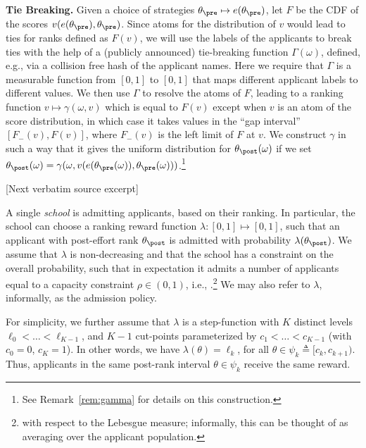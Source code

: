 \documentclass[10pt]{article}
\begin{document}
\begin{ReviewVerbatim}
{\textbf{Tie Breaking.}
Given a choice of strategies $\theta_\pre \mapsto e(\theta_\pre)$, let $F$ be the CDF of the scores $v(e(\theta_\pre),\theta_\pre)$.
Since atoms for the distribution of $v$ would lead to ties for ranks defined as $F(v)$, we will use the labels of the applicants to break ties with the help of a (publicly announced) tie-breaking function $\Gamma(\omega)$, defined, e.g., via a collision free hash of the applicant names. Here  we require  that $\Gamma$  is a measurable function from $[0,1]$ to $[0,1]$ that maps different applicant labels to different values.
We then use $\Gamma$ to resolve the atoms of $F$, leading to a ranking function $v\mapsto \gamma(\omega, v)$ which is equal to $F(v)$ except when $v$ is an atom of the score distribution, {in which case it takes values in the ``gap interval'' $[F_-(v),  F(v)]$, where $F_-(v)$ is the left limit of $F$ at $v$.}  We  construct $\gamma$ in such a way that it
gives the uniform distribution for $\theta_\post(\omega)$ if we set  $\theta_\post(\omega)=\gamma(\omega,v(e(\theta_\pre(\omega)),\theta_\pre(\omega)))$.\footnote{See Remark~\ref{rem:gamma} for details on this construction.}

[Next verbatim source excerpt]

 A single \textit{school} is admitting applicants, based on their ranking. In particular, the school can choose a ranking reward function $\lambda : [0, 1] \mapsto [0, 1]$, such that an applicant with post-effort rank $\theta_\post$ is admitted with probability $\lambda(\theta_\post)$. We assume that $\lambda$ is non-decreasing and that the school has a constraint on the overall probability, such that in expectation it admits a number of applicants equal to {a} capacity constraint  $\rho \in (0,1)$, i.e., \lledit{$\E_{\theta_\post}[\lambda(\theta_\post)] = \rho $}.\footnote{ with respect to the Lebesgue measure; informally, this can be thought of as averaging over the applicant population.} We may also refer to $\lambda$, informally, as the admission policy.



For simplicity, we further assume that $\lambda$ is a step-function with $K$ distinct levels $\ell_0 < \dots < \ell_{K-1}$, and $K-1$ cut-points parameterized by $c_1< \dots < c_{K-1}$ (with $c_0 = 0$, $c_K = 1$). %
In other words, we have $\lambda(\theta) = \ell_k$, for all $\theta \in \psi_k \triangleq [c_{k}, c_{k+1})$. Thus, applicants in the same post-rank interval $\theta \in \psi_k$ receive the same reward.

}
\end{ReviewVerbatim}
\end{document}
